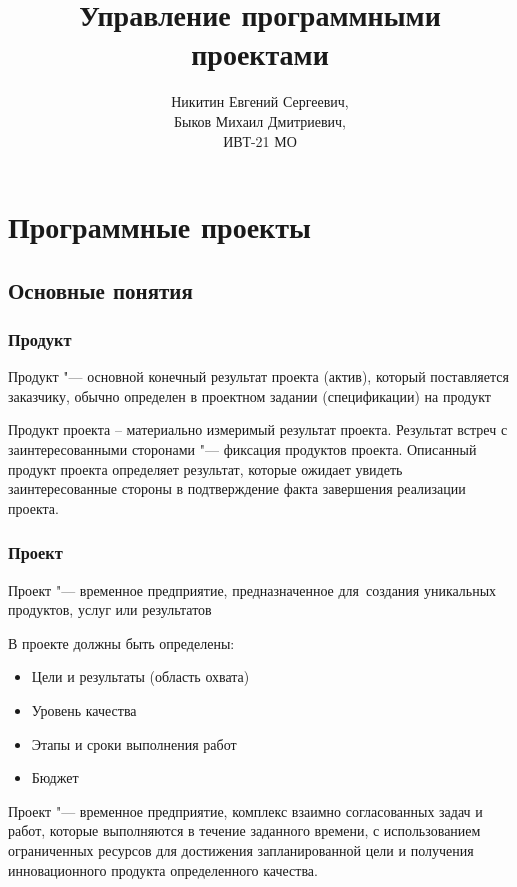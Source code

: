 \documentclass{../industrial-development}
\title{Управление программными проектами}
\author{Никитин Евгений Сергеевич,\\Быков Михаил Дмитриевич,\\ИВТ-21 МО}
\date{}
\begin{document}
    
    \begin{frame}
      \titlepage
    \end{frame}

    \section{Программные проекты}

    \subsection{Основные понятия}

    \begin{frame} \frametitle{Продукт}
        \begin{definition}
            Продукт "--- основной конечный результат проекта (актив), который поставляется заказчику, обычно определен в проектном задании (спецификации) на продукт
        \end{definition}
        \medskip
    \end{frame}
    \lecturenotes

Продукт проекта – материально измеримый результат проекта. Результат встреч с заинтересованными сторонами "--- фиксация продуктов проекта. Описанный продукт проекта определяет результат, которые ожидает увидеть заинтересованные стороны в подтверждение факта завершения реализации проекта.

    \begin{frame} \frametitle{Проект}
        \begin{definition}
            Проект "--- временное предприятие, предназначенное для~создания уникальных продуктов, услуг или результатов
        \end{definition}
        \medskip
        В проекте должны быть определены:
        \begin{itemize}
            \item Цели и результаты (область охвата)
            \item Уровень качества
            \item Этапы и сроки выполнения работ
            \item Бюджет
        \end{itemize}
    \end{frame}
    \lecturenotes

Проект "--- временное предприятие,  комплекс взаимно согласованных задач и работ, которые выполняются в течение заданного времени, с использованием ограниченных ресурсов для достижения запланированной цели и получения инновационного продукта определенного качества.
\end{document}
